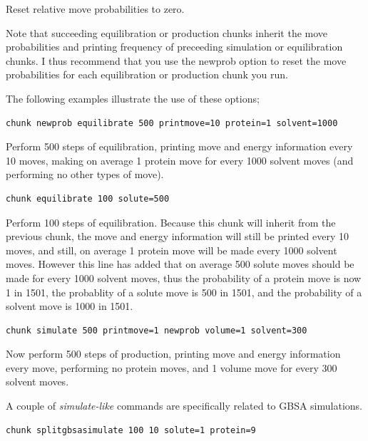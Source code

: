 \documentclass[letterpaper,10pt,english]{sphinxmanual}
\begin{document}
Reset relative move probabilities to zero.

Note that succeeding equilibration or production chunks inherit the move probabilities and printing frequency of preceeding simulation or equilibration chunks. I thus recommend that you use the newprob option to reset the move probabilities for each equilibration or production chunk you run.

The following examples illustrate the use of these options;

\begin{Verbatim}[commandchars=\\\{\}]
chunk newprob equilibrate 500 printmove=10 protein=1 solvent=1000
\end{Verbatim}

Perform 500 steps of equilibration, printing move and energy information every 10 moves, making on average 1 protein move for every 1000 solvent moves (and performing no other types of move).

\begin{Verbatim}[commandchars=\\\{\}]
chunk equilibrate 100 solute=500
\end{Verbatim}

Perform 100 steps of equilibration. Because this chunk will inherit from the previous chunk, the move and energy information will still be printed every 10 moves, and still, on average 1 protein move will be made every 1000 solvent moves. However this line has added that on average 500 solute moves should be made for every 1000 solvent moves, thus the probability of a protein move is now 1 in 1501, the probablity of a solute move is 500 in 1501, and the probability of a solvent move is 1000 in 1501.

\begin{Verbatim}[commandchars=\\\{\}]
chunk simulate 500 printmove=1 newprob volume=1 solvent=300
\end{Verbatim}

Now perform 500 steps of production, printing move and energy information every move, performing no protein moves, and 1 volume move for every 300 solvent moves.

A couple of \emph{simulate-like} commands are specifically related to GBSA simulations.

\begin{Verbatim}[commandchars=\\\{\}]
chunk splitgbsasimulate 100 10 solute=1 protein=9
\end{Verbatim}
\end{document}
